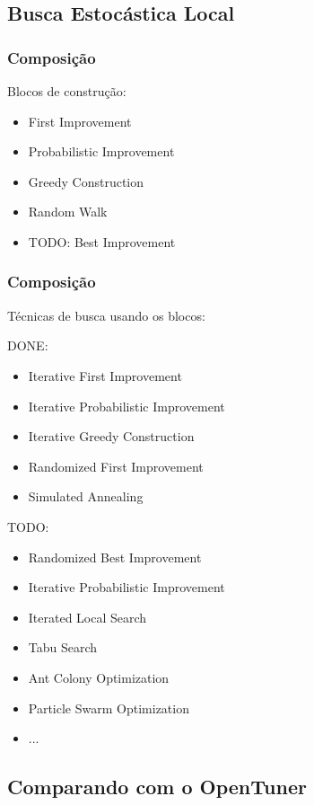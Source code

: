\documentclass[10pt, compress]{beamer}
\begin{document}
\subsection{Busca Estocástica Local}

\begin{frame}[fragile]
    \frametitle{Composição}
    Blocos de construção:
    \begin{itemize}
        \item First Improvement
        \item Probabilistic Improvement
        \item Greedy Construction
        \item Random Walk
            \pause
        \item \alert{TODO}: Best Improvement
    \end{itemize}
\end{frame}

\begin{frame}[fragile]
    \frametitle{Composição}
    Técnicas de busca usando os blocos:

    \alert{DONE}:
    \begin{itemize}
        \item Iterative First Improvement
        \item Iterative Probabilistic Improvement
        \item Iterative Greedy Construction
        \item Randomized First Improvement
        \item Simulated Annealing
    \end{itemize}
    \pause

    \alert{TODO}:
    \begin{itemize}
        \item Randomized Best Improvement
        \item Iterative Probabilistic Improvement
        \item Iterated Local Search
        \item Tabu Search
        \item Ant Colony Optimization
        \item Particle Swarm Optimization
        \item ...
    \end{itemize}
\end{frame}

\subsection{Comparando com o OpenTuner}
\end{document}
